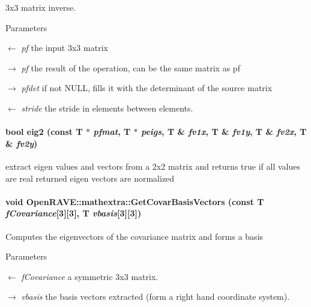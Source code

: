 3x3 matrix inverse. 


\begin{DoxyParams}{Parameters}
\item[\mbox{$\leftarrow$} {\em pf}]the input 3x3 matrix \item[\mbox{$\rightarrow$} {\em pf}]the result of the operation, can be the same matrix as pf \item[\mbox{$\rightarrow$} {\em pfdet}]if not NULL, fills it with the determinant of the source matrix \item[\mbox{$\leftarrow$} {\em stride}]the stride in elements between elements. \end{DoxyParams}
\hypertarget{namespaceOpenRAVE_1_1mathextra_a3c6e92adb2deae09d195c86818918c4b}{
\paragraph[{eig2}]{\setlength{\rightskip}{0pt plus 5cm}bool eig2 (const T $\ast$ {\em pfmat}, \/  T $\ast$ {\em peigs}, \/  T \& {\em fv1x}, \/  T \& {\em fv1y}, \/  T \& {\em fv2x}, \/  T \& {\em fv2y})}\hfill}
\label{namespaceOpenRAVE_1_1mathextra_a3c6e92adb2deae09d195c86818918c4b}
extract eigen values and vectors from a 2x2 matrix and returns true if all values are real returned eigen vectors are normalized \hypertarget{namespaceOpenRAVE_1_1mathextra_ac7b910595448278e861ce787a01fc9a2}{
\paragraph[{GetCovarBasisVectors}]{\setlength{\rightskip}{0pt plus 5cm}void OpenRAVE::mathextra::GetCovarBasisVectors (const T {\em fCovariance}\mbox{[}3\mbox{]}\mbox{[}3\mbox{]}, \/  T {\em vbasis}\mbox{[}3\mbox{]}\mbox{[}3\mbox{]})}\hfill}
\label{namespaceOpenRAVE_1_1mathextra_ac7b910595448278e861ce787a01fc9a2}
Computes the eigenvectors of the covariance matrix and forms a basis 
\begin{DoxyParams}{Parameters}
\item[\mbox{$\leftarrow$} {\em fCovariance}]a symmetric 3x3 matrix. \item[\mbox{$\rightarrow$} {\em vbasis}]the basis vectors extracted (form a right hand coordinate system). \end{DoxyParams}

